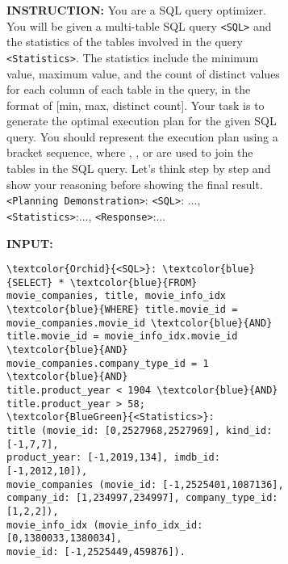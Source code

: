 \begin{figure}
    \centering
    \footnotesize
    \begin{subfigure}{}
        \centering
        \begin{tcolorbox}[colback=yellow!10!white, colframe=blue!75!black]
            \textbf{INSTRUCTION:} You are a SQL query optimizer. You will be given a multi-table SQL query {\color{Orchid} \texttt{<SQL>}} and the statistics of the tables involved in the query {\color{BlueGreen} \texttt{<Statistics>}}. The statistics include the minimum value, maximum value, and the count of distinct values for each column of each table in the query, in the format of [min, max, distinct count]. Your task is to generate the optimal execution plan for the given SQL query. You should represent the execution plan using a bracket sequence, where \HashJoin, \NestLoop, or \MergeJoin are used to join the tables in the SQL query. Let's think step by step and show your reasoning before showing the final result. {\color{Peach} \texttt{<Planning Demonstration>}: \texttt{<SQL>}: ..., \texttt{<Statistics>}:..., \texttt{<Response>}:...}
            
            \textbf{INPUT:}
            \begin{Verbatim}[commandchars=\\\{\}]
\textcolor{Orchid}{<SQL>}: \textcolor{blue}{SELECT} * \textcolor{blue}{FROM} movie_companies, title, movie_info_idx  
\textcolor{blue}{WHERE} title.movie_id = movie_companies.movie_id \textcolor{blue}{AND} 
title.movie_id = movie_info_idx.movie_id  \textcolor{blue}{AND} 
movie_companies.company_type_id = 1 \textcolor{blue}{AND} 
title.product_year < 1904 \textcolor{blue}{AND} title.product_year > 58;
\textcolor{BlueGreen}{<Statistics>}: 
title (movie_id: [0,2527968,2527969], kind_id: [-1,7,7], 
product_year: [-1,2019,134], imdb_id: [-1,2012,10]), 
movie_companies (movie_id: [-1,2525401,1087136], 
company_id: [1,234997,234997], company_type_id: [1,2,2]), 
movie_info_idx (movie_info_idx_id: [0,1380033,1380034], 
movie_id: [-1,2525449,459876]).
            \end{Verbatim}          
        \end{tcolorbox} 
        \label{fig:query_instruct:prompt}
    \end{subfigure}%
    

\end{figure}
